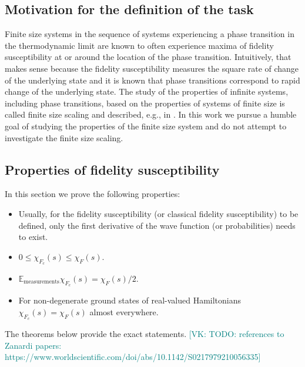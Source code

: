 \documentclass[american,aps,pra,reprint,floatfix,nofootinbib,superscriptaddress]{revtex4-2}
\newcommand{\VK}[1]{\textcolor{teal}{[VK: #1]}}
\begin{document}
\subsection{Motivation for the definition of the task}
Finite size systems in the sequence of systems experiencing a phase transition
in the thermodynamic limit are known to often experience maxima of fidelity
susceptibility at or around the location of the phase transition. Intuitively,
that makes sense because the fidelity susceptibility measures the square rate of
change of the underlying state and it is known that phase transitions correspond
to rapid change of the underlying state. The study of the properties of infinite
systems, including phase transitions, based on the properties of systems
of finite size is called finite size scaling and described, e.g., in
\cite{cardy2012finite}. In this work we pursue a humble goal of studying
the properties of the finite size system and do not attempt to investigate
the finite size scaling.

\subsection{Properties of fidelity susceptibility}
\label{ss:fidelity-susceptibility}
In this section we
prove the following properties:
\begin{itemize}
  \item Usually, for the fidelity susceptibility (or classical fidelity
    susceptibility) to be defined, only 
    the first
    derivative of the wave function
    (or probabilities) needs to exist.
  \item $0 \leq \chi_{F_c}(s) \leq \chi_F(s)$.
  \item $\mathbb{E}_{\textrm{measurements}} \chi_{F_c}(s) = \chi_F(s)/2$.
  \item For non-degenerate ground states of real-valued Hamiltonians
  $\chi_{F_c}(s) = \chi_F(s)$ almost everywhere.
\end{itemize}
The theorems below provide 
the exact statements.
\VK{TODO: references to Zanardi papers: https://www.worldscientific.com/doi/abs/10.1142/S0217979210056335}
\end{document}
